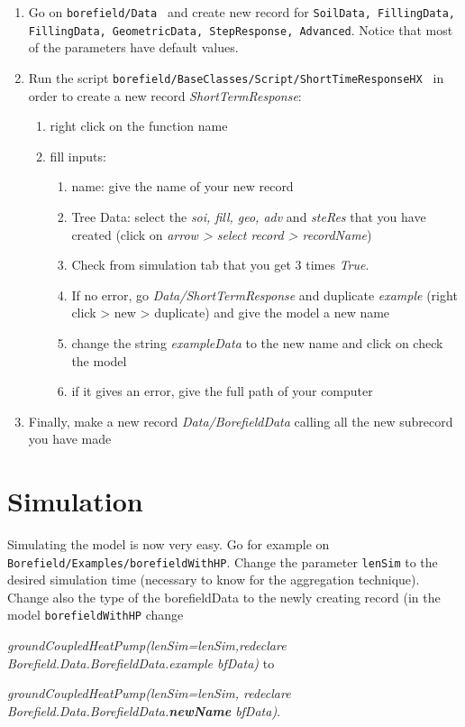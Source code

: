 \documentclass[a4paper,oneside,11pt]{report}
\begin{document}
\begin{enumerate}
\item Go on {\tt borefield/Data } and create new record for {\tt SoilData, FillingData, FillingData, GeometricData, StepResponse, Advanced}. Notice that most of the parameters have default values.
\item Run the script {\tt borefield/BaseClasses/Script/ShortTimeResponseHX } in order to create a new record \textit{ShortTermResponse}:
	\begin{enumerate}
	\item right click on the function name
	\item fill inputs:
		\begin{enumerate}
		\item name: give the name of your new record
		\item Tree Data: select the \textit{soi, fill, geo, adv} and \textit{steRes} that you have created (click on \textit{arrow > select record > recordName})
		\item Check from simulation tab that you get 3 times \textit{True}. 
		\item If no error, go \textit{Data/ShortTermResponse} and duplicate \textit{example} (right click > new > duplicate) and give the model a new name
		\item change the string \textit{exampleData} to the new name and click on check the model
		\item if it gives an error, give the full path of your computer
		\end{enumerate}
	\end{enumerate}
\item Finally, make a new record \textit{Data/BorefieldData} calling all the new subrecord you have made
\end{enumerate}


\section{Simulation}
Simulating the model is now very easy. Go for example on {\tt Borefield/Examples/borefieldWithHP}. Change the parameter {\tt lenSim} to the desired simulation time (necessary to know for the aggregation technique). Change also the type of the borefieldData to the newly creating record (in the model {\tt borefieldWithHP} change 

\textit{groundCoupledHeatPump(lenSim=lenSim,redeclare Borefield.Data.BorefieldData.example bfData)} to 

\textit{ groundCoupledHeatPump(lenSim=lenSim, redeclare Borefield.Data.BorefieldData.\textbf{newName} bfData)}.
\end{document}
